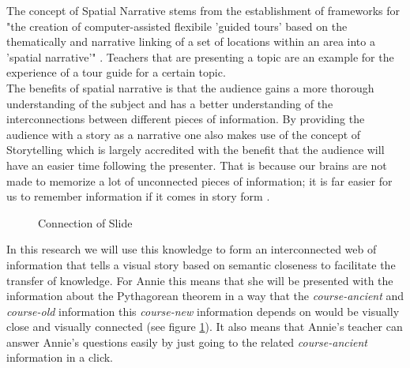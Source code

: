 \documentclass[twoside, 12pt]{article}
\begin{document}
The concept of Spatial Narrative stems from the establishment of frameworks for "the creation of computer-assisted flexibile 'guided tours' based on the thematically and narrative linking of a set of locations within an area into a 'spatial narrative'" \cite{SpatialNarratives:npentrel14}. Teachers that are presenting a topic are an example for the experience of a tour guide for a certain topic.\\

The benefits of spatial narrative is that the audience gains a more thorough understanding of the subject and has a better understanding of the interconnections between different pieces of information. By providing the audience with a story as a narrative one also makes use of the concept of Storytelling which is largely accredited with the benefit that the audience will have an easier time following the presenter. That is because our brains are not made to memorize a lot of unconnected pieces of information; it is far easier for us to remember information if it comes in story form \cite{Storytelling:npentrel14}.\\

\begin{figure}
\vspace{-28pt}
  \begin{center}
  \end{center}
\vspace{-20pt}
  \caption{Connection of Slide}
  \label{fig:arrowspyg}
\vspace{-10pt}
\end{figure}

In this research we will use this knowledge to form an interconnected web of information that tells a visual story based on semantic closeness to facilitate the transfer of knowledge. For Annie this means that she will be presented with the information about the Pythagorean theorem in a way that the \textit{course-ancient} and \textit{course-old} information this \textit{course-new} information depends on would be visually close and visually connected (see figure \ref{fig:arrowspyg}). It also means that Annie's teacher can answer Annie's questions easily by just going to the related \textit{course-ancient} information in a click.\\
\end{document}
